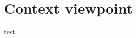 \section{Context viewpoint}

\begin{figure}[H]
  \label{fig:viewpoint-context-main}
\end{figure}

test
